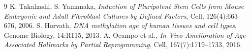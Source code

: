 \documentclass[11pt,a4paper]{article}
\theoremstyle{definition}
\begin{document}
\begin{thebibliography}{9}
 K. Takahashi, S. Yamanaka, \emph{Induction of Pluripotent Stem Cells from Mouse Embryonic and Adult Fibroblast Cultures by Defined Factors}, Cell, 126(4):663--676, 2006.
 S. Horvath, \emph{DNA methylation age of human tissues and cell types}, Genome Biology, 14:R115, 2013.
 A. Ocampo et al., \emph{In Vivo Amelioration of Age-Associated Hallmarks by Partial Reprogramming}, Cell, 167(7):1719--1733, 2016.
\end{thebibliography}
\end{document}
